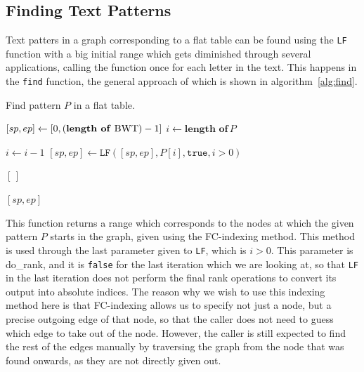 \documentclass[a4paper,12pt,twoside,BCOR=10mm]{scrbook}
\begin{document}
\subsection{Finding Text Patterns}

Text patters in a graph corresponding to a flat table 
can be found using the \texttt{LF} function with a big initial range which gets diminished through 
several applications, calling the function once for each letter in the text. 
This happens in the \texttt{find} function, the general approach of which is shown in algorithm~\ref{alg:find}. 
\begin{algorithm}
\caption[Find pattern in a flat table]{Find pattern $ P $ in a flat table.}
\label{alg:find}
\begin{algorithmic}[1]

\State $ [ sp, ep ] \gets [ 0, ( \textrm{\textbf{length of} BWT} ) - 1 ] $
\State $ i \gets \textbf{length of} \, P $

\State \phantom{nl}

	\State $ i \gets i - 1 $
	\State $ [ sp, ep ] \gets \texttt{LF} ( [ sp, ep ] , P [ i ] , \texttt{true} , i > 0 ) $
	
	\State \phantom{nl}

		\State \Return $ [ \, ] $
	\EndIf
\EndWhile

\State \phantom{nl}

\State \Return $ [ sp, ep ] $

\end{algorithmic}
\end{algorithm}
This function returns a range which corresponds to the nodes 
at which the given pattern $ P $ starts in the graph, 
given using the FC-indexing method. 
This method is used through the last parameter given to \texttt{LF}, which is $ i > 0 $. 
This parameter is do\_rank, and it is \texttt{false} for the last iteration which we 
are looking at, so that \texttt{LF} in the last iteration does not perform the final rank operations 
to convert its output into absolute indices. 
The reason why we wish to use this indexing method here 
is that FC-indexing allows us to specify not just a node, 
but a precise outgoing edge of that node, so that the caller does 
not need to guess which edge to take out of the node. 
However, the caller is still expected to find the rest of the edges manually by 
traversing the graph from the node that was found onwards, 
as they are not directly given out.
\end{document}
